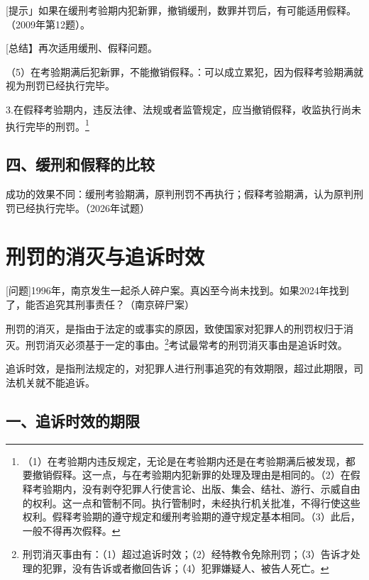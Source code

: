 [提示」如果在缓刑考验期内犯新罪，撤销缓刑，数罪并罚后，有可能适用假释。（2009年第12题）。

[总结】再次适用缓刑、假释问题。


（5）在考验期满后犯新罪，不能撤销假释。：可以成立累犯，因为假释考验期满就视为刑罚已经执行完毕。

3.在假释考验期内，违反法律、法规或者监管规定，应当撤销假释，收监执行尚未执行完毕的刑罚。\footnote{（1）在考验期内违反规定，无论是在考验期内还是在考验期满后被发现，都要撤销假释。这一点，与在考验期内犯新罪的处理及理由是相同的。（2）在假释考验期内，没有剥夺犯罪人行使言论、出版、集会、结社、游行、示威自由的权利。这一点和管制不同。执行管制时，未经执行机关批准，不得行使这些权利。假释考验期的遵守规定和缓刑考验期的遵守规定基本相同。（3）此后，一般不得再次假释。}

\subsection*{四、缓刑和假释的比较}

成功的效果不同：缓刑考验期满，原判刑罚不再执行；假释考验期满，认为原判刑罚已经执行完毕。（2026年试题）


\section{刑罚的消灭与追诉时效}

[问题]1996年，南京发生一起杀人碎户案。真凶至今尚未找到。如果2024年找到了，能否追究其刑事责任？（南京碎尸案）

刑罚的消灭，是指由于法定的或事实的原因，致使国家对犯罪人的刑罚权归于消灭。刑罚消灭必须基于一定的事由。\footnote{刑罚消灭事由有：（1）超过追诉时效；（2）经特教令免除刑罚；（3）告诉才处理的犯罪，没有告诉或者撤回告诉；（4）犯罪嫌疑人、被告人死亡。}考试最常考的刑罚消灭事由是追诉时效。

追诉时效，是指刑法规定的，对犯罪人进行刑事追究的有效期限，超过此期限，司法机关就不能追诉。

\subsection*{一、追诉时效的期限}



